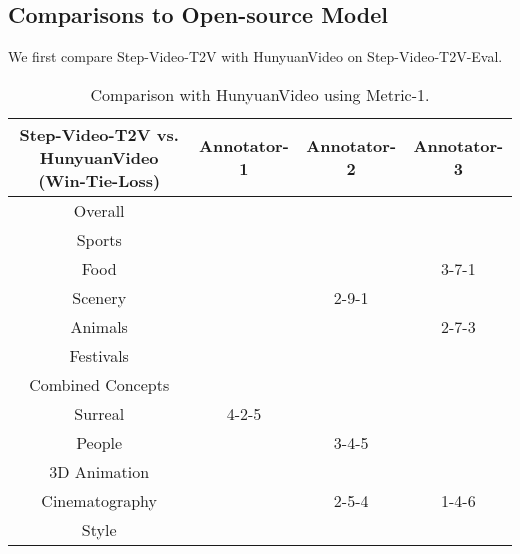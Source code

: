 \subsection{Comparisons to Open-source Model}
We first compare Step-Video-T2V with HunyuanVideo on Step-Video-T2V-Eval.

\begin{table}[ht]\scriptsize
\centering
\begin{tabular}{c|c|c|c}
\hline
Step-Video-T2V vs. HunyuanVideo (Win-Tie-Loss) & Annotator-1  & Annotator-2 & Annotator-3 \\
\hline
\hline
Overall & \cellcolor{green!20}{59-22-47} & \cellcolor{green!20}{46-47-35} & \cellcolor{green!20}{54-41-33} \\
\hline
\hline
Sports & \cellcolor{green!20}{6-3-3} & \cellcolor{green!20}{5-5-2} & \cellcolor{green!20}{6-6-0} \\
\hline
Food & \cellcolor{green!20}{5-2-4} & \cellcolor{green!20}{5-4-2} & 3-7-1 \\
\hline
Scenery & \cellcolor{green!20}{5-3-4} & 2-9-1 & \cellcolor{green!20}{7-1-4} \\
\hline
Animals & \cellcolor{yellow!20}{6-0-6} & \cellcolor{yellow!20}{3-6-3} & 2-7-3 \\
\hline
Festivals & \cellcolor{green!20}{4-4-3} & \cellcolor{green!20}{5-2-4} & \cellcolor{green!20}{4-5-2} \\
\hline
Combined Concepts & \cellcolor{yellow!20}{5-2-5} & \cellcolor{green!20}{6-3-3} & \cellcolor{green!20}{8-1-3} \\
\hline
Surreal & 4-2-5 & \cellcolor{green!20}{5-2-4} & \cellcolor{green!20}{6-2-3} \\
\hline
People & \cellcolor{green!20}{6-2-4} & 3-4-5 & \cellcolor{yellow!20}{5-2-5} \\
\hline
3D Animation & \cellcolor{green!20}{7-1-4} & \cellcolor{green!20}{4-5-3} & \cellcolor{green!20}{6-3-3} \\
\hline
Cinematography & \cellcolor{yellow!20}{5-1-5} & 2-5-4 & 1-4-6 \\
\hline
Style & \cellcolor{green!20}{6-2-4} & \cellcolor{green!20}{6-2-4} & \cellcolor{green!20}{6-3-3} \\
\hline
\end{tabular}
\caption{Comparison with HunyuanVideo using Metric-1.}
\label{ranking}
\end{table}



